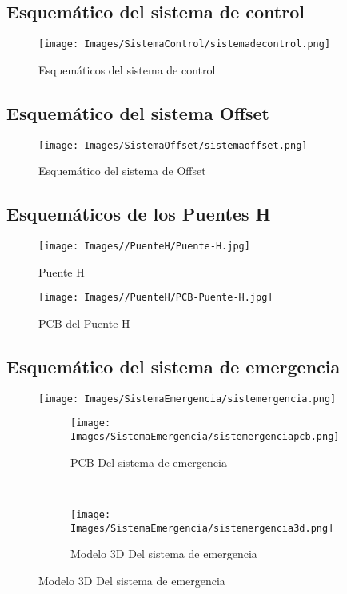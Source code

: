 \documentclass{article}
\begin{document}
\subsection{Esquemático del sistema de control}
\begin{figure}[H]
    \centering
    \texttt{[image: Images/SistemaControl/sistemadecontrol.png]}
    \caption{Esquemáticos del sistema de control}
\end{figure}

\subsection{Esquemático del sistema Offset}
\begin{figure}[H]
    \centering
    \texttt{[image: Images/SistemaOffset/sistemaoffset.png]}
    \caption{Esquemático del sistema de Offset}
\end{figure}

\subsection{Esquemáticos de los Puentes H}
\begin{figure}
    \centering
    \texttt{[image: Images//PuenteH/Puente-H.jpg]}
    \caption{Puente H}
    \label{fig:enter-label}
\end{figure}

\begin{figure}
    \centering
    \texttt{[image: Images//PuenteH/PCB-Puente-H.jpg]}
    \caption{PCB del Puente H}
    \label{fig:enter-label}
\end{figure}

\subsection{Esquemático del sistema de emergencia}
\begin{figure}[H]
    \centering
    \texttt{[image: Images/SistemaEmergencia/sistemergencia.png]}
    \caption{Esquemático del sistema de emegencia}


    \begin{subfigure}[t]{0.5\textwidth}
        \centering
        \texttt{[image: Images/SistemaEmergencia/sistemergenciapcb.png]}
        \caption{PCB Del sistema de emergencia}
    \end{subfigure}%
    ~ 
    \begin{subfigure}[t]{0.5\textwidth}
        \centering
        \texttt{[image: Images/SistemaEmergencia/sistemergencia3d.png]}
        \caption{Modelo 3D Del sistema de emergencia}
    \end{subfigure}

\end{figure}
\end{document}

